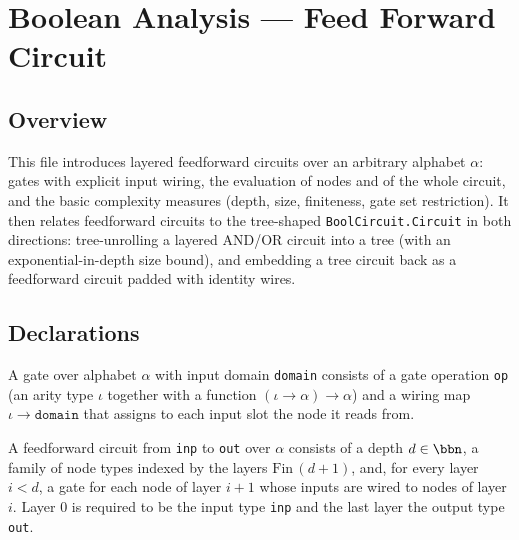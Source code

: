 \chapter{Boolean Analysis — Feed Forward Circuit}
\section{Overview}

This file introduces layered feedforward circuits over an arbitrary alphabet $\alpha$:
gates with explicit input wiring, the evaluation of nodes and of the whole circuit,
and the basic complexity measures (depth, size, finiteness, gate set restriction).
It then relates feedforward circuits to the tree-shaped \texttt{BoolCircuit.Circuit}
in both directions: tree-unrolling a layered AND/OR circuit into a tree (with an
exponential-in-depth size bound), and embedding a tree circuit back as a
feedforward circuit padded with identity wires.

\section{Declarations}

\begin{definition}
\label{BoolCircuit.Gate}
\leanok
A gate over alphabet $\alpha$ with input domain \texttt{domain} consists of a gate
operation \texttt{op} (an arity type $\iota$ together with a function
$(\iota \to \alpha) \to \alpha$) and a wiring map $\iota \to \texttt{domain}$ that
assigns to each input slot the node it reads from.
\end{definition}

\begin{definition}
\label{BoolCircuit.FeedForward}
\leanok
{}
A feedforward circuit from \texttt{inp} to \texttt{out} over $\alpha$ consists of a
depth $d \in \bbn$, a family of node types indexed by the layers
$\mathrm{Fin}\,(d+1)$, and, for every layer $i < d$, a gate for each node of layer
$i+1$ whose inputs are wired to nodes of layer $i$. Layer $0$ is required to be the
input type \texttt{inp} and the last layer the output type \texttt{out}.
\end{definition}

